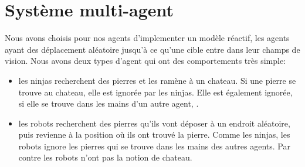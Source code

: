 \section{Système multi-agent}
\thispagestyle{fancy}

Nous avons choisis pour nos agents d'implementer un modèle réactif,
les agents ayant des déplacement aléatoire jusqu'à ce qu'une cible
entre dans leur champs de vision. Nous avons deux types d'agent qui
ont des comportements très simple:

\begin{itemize}
\item les ninjas recherchent des pierres et les ramène à un
  chateau. Si une pierre se trouve au chateau, elle est ignorée par
  les ninjas. Elle est également ignorée, si elle se trouve dans les
  mains d'un autre agent, .
\item les robots recherchent des pierres qu'ils vont déposer à un
  endroit aléatoire, puis revienne à la position où ils ont trouvé la
  pierre. Comme les ninjas, les robots ignore les pierres qui se
  trouve dans les mains des autres agents. Par contre les robots
  n'ont pas la notion de chateau.
\end{itemize} 

